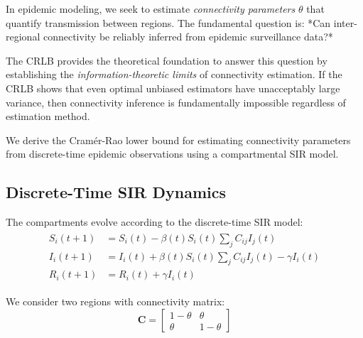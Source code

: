 In epidemic modeling, we seek to estimate \emph{connectivity parameters} $\theta$ that quantify transmission between regions. The fundamental question is: *Can inter-regional connectivity be reliably inferred from epidemic surveillance data?*

The CRLB provides the theoretical foundation to answer this question by establishing the \emph{information-theoretic limits} of connectivity estimation. If the CRLB shows that even optimal unbiased estimators have unacceptably large variance, then connectivity inference is fundamentally impossible regardless of estimation method.

We derive the Cramér-Rao lower bound for estimating connectivity
parameters from discrete-time epidemic observations using a
compartmental SIR model.

\subsection{Discrete-Time SIR Dynamics}

The compartments evolve according to the discrete-time SIR model:
\begin{align}\begin{split}\label{eq:sir}
S_i(t+1) &= S_i(t) - \beta(t) S_i(t) \sum_j C_{ij} I_j(t) \\
I_i(t+1) &= I_i(t) + \beta(t) S_i(t) \sum_j C_{ij} I_j(t) - \gamma I_i(t) \\
R_i(t+1) &= R_i(t) + \gamma I_i(t)
\end{split}\end{align}

We consider two regions with connectivity matrix:
\begin{equation}
\mathbf{C} = \begin{bmatrix} 1-\theta & \theta \\ \theta & 1-\theta \end{bmatrix}
\end{equation}


